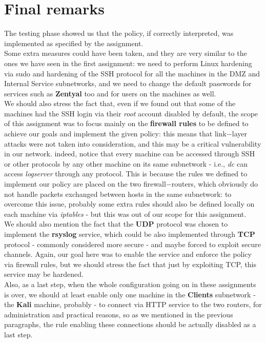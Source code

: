 \section{Final remarks}
The testing phase showed us that the policy, if correctly interpreted, was implemented as specified by the assignment.\\
Some extra measures could have been taken, and they are very similar to the ones we have seen in the first assignment: we need to perform Linux hardening via sudo and hardening of the SSH protocol for all the machines in the DMZ and Internal Service subnetworks, and we need to change the default passwords for services such as \textbf{Zentyal} too and for users on the machines as well.\\
We should also stress the fact that, even if we found out that some of the machines had the SSH login via their \textit{root} account disabled by default, the scope of this assignment was to focus mainly on the \textbf{firewall rules} to be defined to achieve our goals and implement the given policy: this means that link$-$layer attacks were not taken into consideration, and this may be a critical vulnerability in our network. indeed, notice that every machine can be accessed through SSH or other protocols by any other machine on its same subnetwork - i.e., \textit{dc} can access \textit{logserver} through any protocol. This is because the rules we defined to implement our policy are placed on the two firewall$-$routers, which obviously do not handle packets exchanged between hosts in the same subnetwork: to overcome this issue, probably some extra rules should also be defined locally on each machine via \textit{iptables} - but this was out of our scope for this assignment.\\
We should also mention the fact that the \textbf{UDP} protocol was chosen to implement the \textbf{rsyslog} service, which could be also implemented through \textbf{TCP} protocol - commonly considered more secure - and maybe forced to exploit secure channels. Again, our goal here was to enable the service and enforce the policy via firewall rules, but we should stress the fact that just by exploiting TCP, this service may be hardened.\\
Also, as a last step, when the whole configuration going on in these assignments is over, we should at least enable only one machine in the \textbf{Clients} subnetwork - the \textbf{Kali} machine, probably - to connect via HTTP service to the two routers, for administration and practical reasons, so as we mentioned in the previous paragraphs, the rule enabling these connections should be actually disabled as a last step.
